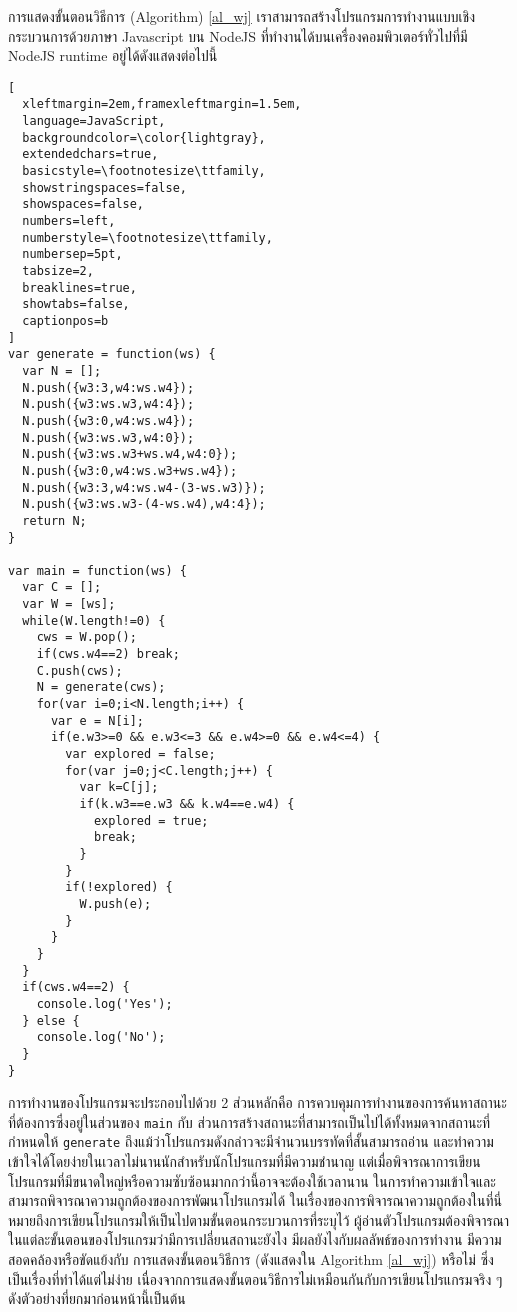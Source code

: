 %
\par{
การแสดงขั้นตอนวิธีการ (Algorithm) \ref{al_wj}
เราสามารถสร้างโปรแกรมการทำงานแบบเชิงกระบวนการด้วยภาษา Javascript บน NodeJS 
ที่ทำงานได้บนเครื่องคอมพิวเตอร์ทั่วไปที่มี NodeJS runtime อยู่ได้ดังแสดงต่อไปนี้
%
\begin{lstlisting}[
  xleftmargin=2em,framexleftmargin=1.5em,
  language=JavaScript,
  backgroundcolor=\color{lightgray},
  extendedchars=true,
  basicstyle=\footnotesize\ttfamily,
  showstringspaces=false,
  showspaces=false,
  numbers=left,
  numberstyle=\footnotesize\ttfamily,
  numbersep=5pt,
  tabsize=2,
  breaklines=true,
  showtabs=false,
  captionpos=b
]
var generate = function(ws) {
  var N = [];
  N.push({w3:3,w4:ws.w4});
  N.push({w3:ws.w3,w4:4});
  N.push({w3:0,w4:ws.w4});
  N.push({w3:ws.w3,w4:0});
  N.push({w3:ws.w3+ws.w4,w4:0});
  N.push({w3:0,w4:ws.w3+ws.w4});
  N.push({w3:3,w4:ws.w4-(3-ws.w3)});
  N.push({w3:ws.w3-(4-ws.w4),w4:4});
  return N;
}

var main = function(ws) {
  var C = [];
  var W = [ws];
  while(W.length!=0) {
    cws = W.pop();
    if(cws.w4==2) break;
    C.push(cws);
    N = generate(cws);
    for(var i=0;i<N.length;i++) {
      var e = N[i];
      if(e.w3>=0 && e.w3<=3 && e.w4>=0 && e.w4<=4) {
        var explored = false;
        for(var j=0;j<C.length;j++) {
          var k=C[j];
          if(k.w3==e.w3 && k.w4==e.w4) {
            explored = true;
            break;
          }
        }
        if(!explored) {
          W.push(e);
        }
      }
    }
  }
  if(cws.w4==2) {
    console.log('Yes');
  } else {
    console.log('No');
  }
}
\end{lstlisting}
%
การทำงานของโปรแกรมจะประกอบไปด้วย 2 ส่วนหลักคือ
การควบคุมการทำงานของการค้นหาสถานะที่ต้องการซึ่งอยู่ในส่วนของ \texttt{main}
กับ ส่วนการสร้างสถานะที่สามารถเป็นไปได้ทั้งหมดจากสถานะที่กำหนดให้ \texttt{generate}
ถึงแม้ว่าโปรแกรมดังกล่าวจะมีจำนวนบรรทัดที่สั้นสามารถอ่าน
และทำความเข้าใจได้โดยง่ายในเวลาไม่นานนักสำหรับนักโปรแกรมที่มีความชำนาญ
แต่เมื่อพิจารณาการเขียนโปรแกรมที่มีขนาดใหญ่หรือความซับซ้อนมากกว่านี้อาจจะต้องใช้เวลานาน
ในการทำความเข้าใจและสามารถพิจารณาความถูกต้องของการพัฒนาโปรแกรมได้ 
ในเรื่องของการพิจารณาความถูกต้องในที่นี่ 
หมายถึงการเขียนโปรแกรมให้เป็นไปตามขั้นตอนกระบวนการที่ระบุไว้
ผู้อ่านตัวโปรแกรมต้องพิจารณาในแต่ละขั้นตอนของโปรแกรมว่ามีการเปลี่ยนสถานะยังไง
มีผลยังไงกับผลลัพธ์ของการทำงาน
มีความสอดคล้องหรือขัดแย้งกับ การแสดงขั้นตอนวิธีการ (ดังแสดงใน Algorithm \ref{al_wj})
หรือไม่
ซึ่งเป็นเรื่องที่ทำได้แต่ไม่ง่าย เนื่องจากการแสดงขั้นตอนวิธีการไม่เหมือนกันกับการเขียนโปรแกรมจริง ๆ
ดังตัวอย่างที่ยกมาก่อนหน้านี้เป็นต้น
}
%
%
%
%
